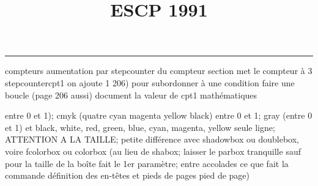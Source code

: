 \documentclass[11pt]{article}%
\title{\bf \vspace{-2cm} ESCP 1991} %
\author{} %
\date{} %
\renewcommand{\headrulewidth}{0pt}%
\renewcommand{\footrulewidth}{0.4pt}%
\begin{document}
\maketitle %
\vspace{-1.4cm}\hrule %
\thispagestyle{fancy}

\vspace*{.2cm}



compteurs%
aumentation par stepcounter du compteur section%
met le compteur à 3%
stepcounter{cpt1} on ajoute 1%
206) pour subordonner à une condition %
faire une boucle (page 206 aussi) %
document la valeur de cpt1 
mathématiques\newcommand{\ch}{\operatorname{ch}} 
\newcommand{\sh}{\operatorname{sh}}
\renewcommand{\tanh}{\operatorname{th}}
\renewcommand{\sinh}{\operatorname{sh}}
\renewcommand{\cosh}{\operatorname{ch}}
\newcommand{\argsh}{\operatorname{argsh}}
\newcommand{\argch}{\operatorname{argch}}
\newcommand{\argth}{\operatorname{argth}}
\newcommand{\ker}{\operatorname{Ker}}
\renewcommand{\im}{\operatorname{Im}}
\newcommand{\rg}{\operatorname{rg}}
\newcommand{\Id}{\operatorname{Id}}
\newcommand{\id}{\operatorname{id}}
\renewcommand{\leq}{\leq}
\renewcommand{\geq}{\geq }

entre 0 et 1); cmyk (quatre cyan magenta yellow black) entre 0 et 1;
gray (entre 0 et 1) et black, white, red, green, blue, cyan, magenta,
yellow%
seule ligne; ATTENTION A LA TAILLE; petite différence avec shadowbox ou
doublebox, voire fcolorbox ou colorbox (au lieu de shabox; laisser le
parbox tranquille sauf pour la taille de la boîte
\newcommand{\Tbox}[1]{\begin{center} \shabox{\parbox{0.6
\linewidth}{#1}} \end{center}} %
fait le 1er paramètre; entre accolades ce que fait la commande
définition des en-têtes et pieds de pages\pagestyle{fancy}
\chead{}
\rfoot[ \ \thepage]{\thepage}
\cfoot{}
\lfoot{}
\thispagestyle{fancy} %
pied de page)\renewcommand{\footrulewidth}{0.4pt}
\renewcommand{\headrulewidth}{0.4pt}
\end{document}
